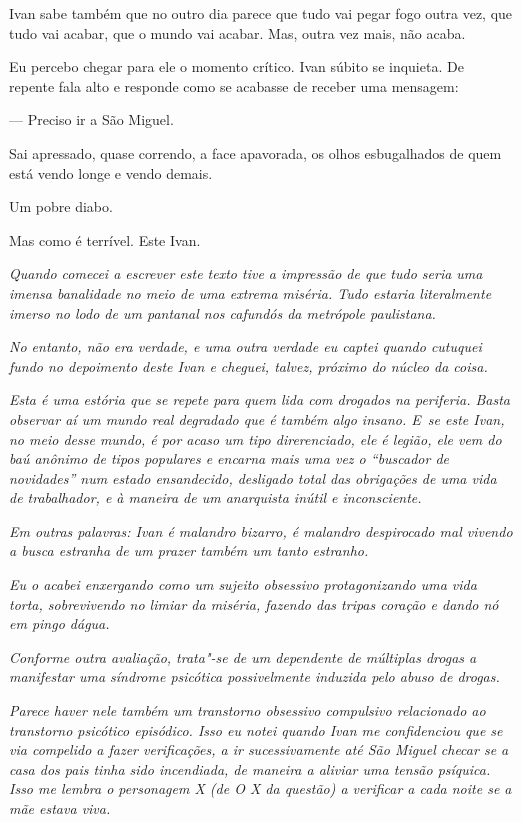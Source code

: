 Ivan sabe também que no outro dia parece que tudo vai pegar fogo outra
vez, que tudo vai acabar, que o mundo vai acabar. Mas, outra vez mais,
não acaba.

\asterisc{}

Eu percebo chegar para ele o momento crítico. Ivan súbito se inquieta.
De repente fala alto e responde como se acabasse de receber uma
mensagem:

— Preciso ir a São Miguel.

Sai apressado, quase correndo, a face apavorada, os olhos esbugalhados
de quem está vendo longe e vendo demais.

Um pobre diabo.

Mas como é terrível. Este Ivan.~

\begin{center}\asterisc{}\end{center}


\emph{Quando comecei a escrever este texto tive a impressão de que tudo
seria uma imensa banalidade no meio de uma extrema miséria. Tudo estaria
literalmente imerso no lodo de um pantanal nos cafundós da metrópole
paulistana.}~

\emph{No entanto, não era verdade, e uma outra verdade eu captei quando
cutuquei fundo no depoimento deste Ivan e cheguei, talvez, próximo do
núcleo da coisa.}~

\emph{Esta é uma estória que se repete para quem lida com drogados na
periferia. Basta observar aí um mundo real degradado que é também algo
insano. E~se este Ivan, no meio desse mundo, é por acaso um tipo
direrenciado, ele é legião, ele vem do baú anônimo de tipos populares e
encarna mais uma vez o ``buscador de novidades'' num estado ensandecido,
desligado total das obrigações de uma vida de trabalhador, e à maneira
de um anarquista inútil e inconsciente.}~

\emph{Em outras palavras: Ivan é malandro bizarro, é malandro
despirocado mal vivendo a busca estranha de um prazer também um tanto
estranho.}~

\emph{Eu o acabei enxergando como um sujeito obsessivo protagonizando
uma vida torta, sobrevivendo no limiar da miséria, fazendo das tripas
coração e dando nó em pingo dágua.}~

\emph{Conforme outra avaliação, trata"-se de um dependente de múltiplas
drogas a manifestar uma síndrome psicótica possivelmente induzida pelo
abuso de drogas.}~

\emph{Parece haver nele também um transtorno obsessivo compulsivo
relacionado ao transtorno psicótico episódico. Isso eu notei quando Ivan
me confidenciou que se via compelido a fazer verificações, a ir
sucessivamente até São Miguel checar se a casa dos pais tinha sido
incendiada, de maneira a aliviar uma tensão psíquica. Isso me lembra o
personagem X (de O X da questão) a verificar a cada noite se a mãe
estava viva.}~

